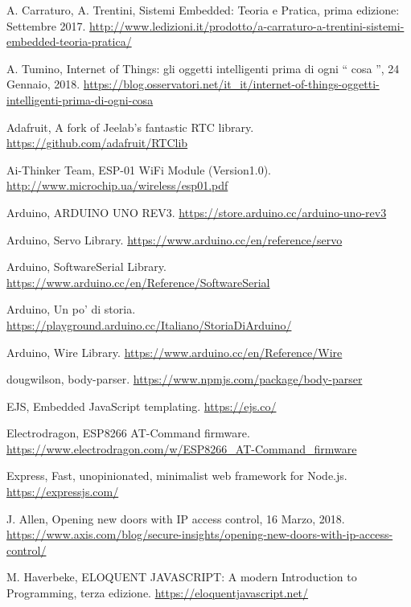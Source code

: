 \documentclass[12pt]{report}
\begin{document}
%
\begin{thebibliography}{00}
%
%

%
A. Carraturo, A. Trentini, Sistemi Embedded: Teoria e Pratica, prima edizione: Settembre 2017.
\url{http://www.ledizioni.it/prodotto/a-carraturo-a-trentini-sistemi-embedded-teoria-pratica/}
%

%
A. Tumino, Internet of Things: gli oggetti intelligenti prima di ogni \textquotedblleft{} cosa \textquotedblright{}, 24 Gennaio, 2018.
\url{https://blog.osservatori.net/it_it/internet-of-things-oggetti-intelligenti-prima-di-ogni-cosa}
%

%
Adafruit, A fork of Jeelab's fantastic RTC library.
\url{https://github.com/adafruit/RTClib}
%

%
Ai-Thinker Team, ESP-01 WiFi Module (Version1.0).
\url{http://www.microchip.ua/wireless/esp01.pdf}
%

%
Arduino, ARDUINO UNO REV3.
\url{https://store.arduino.cc/arduino-uno-rev3}
%

%
Arduino, Servo Library. \url{https://www.arduino.cc/en/reference/servo}
%

%
Arduino, SoftwareSerial Library.
\url{https://www.arduino.cc/en/Reference/SoftwareSerial}
%

%
Arduino, Un po' di storia.
\url{https://playground.arduino.cc/Italiano/StoriaDiArduino/}
%

%
Arduino, Wire Library.
\url{https://www.arduino.cc/en/Reference/Wire}
%

%
dougwilson, body-parser.
\url{https://www.npmjs.com/package/body-parser}
%

%
EJS, Embedded JavaScript templating.
\url{https://ejs.co/}
%

%
Electrodragon, ESP8266 AT-Command firmware.
\url{https://www.electrodragon.com/w/ESP8266\_AT-Command\_firmware}
%

%
Express, Fast, unopinionated, minimalist web framework for Node.js.
\url{https://expressjs.com/}
%

%
J. Allen, Opening new doors with IP access control, 16 Marzo, 2018. \url{https://www.axis.com/blog/secure-insights/opening-new-doors-with-ip-access-control/}
%

%
M. Haverbeke, ELOQUENT JAVASCRIPT: A modern Introduction to Programming, terza edizione.
\url{https://eloquentjavascript.net/}
%


\end{thebibliography}
\end{document}
